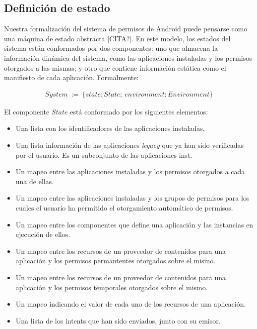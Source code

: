 

\subsection{Definición de estado}
Nuestra formalización del sistema de permisos de Android puede pensarse como una máquina de estado
abstracta [CITA?]. En este modelo, los estados del sistema están conformados por dos componentes: uno
que almacena la información dinámica del sistema, como las aplicaciones instaladas y los permisos otorgados
a las mismas; y otro que contiene información estática como el manifiesto de cada aplicación. Formalmente:

\begin{align*}
    System\ :=\ \{ state: State;\ environment: Environment \}
\end{align*}


El componente $State$ está conformado por los siguientes elementos:

\begin{itemize}
    \item Una lista con los identificadores de las aplicaciones instaladas,
    \item Una lista  información de las aplicaciones \textit{legacy} que ya han sido verificadas por
          el usuario. Es un subconjunto de las aplicaciones inst.
    \item Un mapeo entre las aplicaciones instaladas y los permisos otorgados a cada una de ellas.
    \item Un mapeo entre las aplicaciones instaladas y los grupos de permisos para los cuales el
          usuario ha permitido el otorgamiento automático de permisos.
    \item Un mapeo entre los componentes que define una aplicación y las instancias en ejecución de
          ellos.
    \item Un mapeo entre los recursos de un proveedor de contenidos para una aplicación y los permisos
          permantentes otorgados sobre el mismo.
    \item Un mapeo entre los recursos de un proveedor de contenidos para una aplicación y los permisos
          temporales otorgados sobre el mismo.
    \item Un mapeo indicando el valor de cada uno de los recursos de una aplicación.
    \item Una lista de los intents que han sido enviados, junto con su emisor.
\end{itemize}

